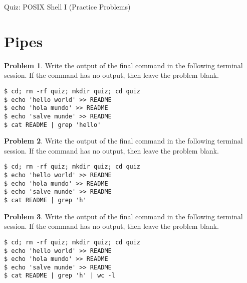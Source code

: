 \documentclass[10pt]{article}
\theoremstyle{definition}
\newtheorem{problem}{Problem}
\newtheorem{note}{Note}
\begin{document}
\begin{center}
    {
\Large
    Quiz: POSIX Shell I (Practice Problems)
}

    \vspace{0.1in}
\end{center}

\vspace{0.15in}
\noindent

\section{Pipes}

\filbreak\begin{problem}
    Write the output of the final command in the following terminal session.
    If the command has no output, then leave the problem blank.
\end{problem}
\begin{lstlisting}
$ cd; rm -rf quiz; mkdir quiz; cd quiz
$ echo 'hello world' >> README
$ echo 'hola mundo' >> README
$ echo 'salve munde' >> README
$ cat README | grep 'hello'
\end{lstlisting}
\vspace{0.4in}

\filbreak\begin{problem}
    Write the output of the final command in the following terminal session.
    If the command has no output, then leave the problem blank.
\end{problem}
\begin{lstlisting}
$ cd; rm -rf quiz; mkdir quiz; cd quiz
$ echo 'hello world' >> README
$ echo 'hola mundo' >> README
$ echo 'salve munde' >> README
$ cat README | grep 'h'
\end{lstlisting}
\vspace{0.4in}

\filbreak\begin{problem}
    Write the output of the final command in the following terminal session.
    If the command has no output, then leave the problem blank.
\end{problem}
\begin{lstlisting}
$ cd; rm -rf quiz; mkdir quiz; cd quiz
$ echo 'hello world' >> README
$ echo 'hola mundo' >> README
$ echo 'salve munde' >> README
$ cat README | grep 'h' | wc -l
\end{lstlisting}
\vspace{0.4in}
\end{document}
